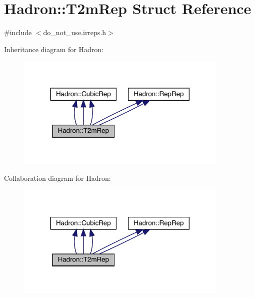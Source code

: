 \hypertarget{structHadron_1_1T2mRep}{}\section{Hadron\+:\+:T2m\+Rep Struct Reference}
\label{structHadron_1_1T2mRep}


{\ttfamily \#include $<$do\+\_\+not\+\_\+use.\+irreps.\+h$>$}



Inheritance diagram for Hadron\+:
\nopagebreak
\begin{figure}[H]
\begin{center}
\leavevmode
\includegraphics[width=288pt]{d0/dfb/structHadron_1_1T2mRep__inherit__graph}
\end{center}
\end{figure}


Collaboration diagram for Hadron\+:
\nopagebreak
\begin{figure}[H]
\begin{center}
\leavevmode
\includegraphics[width=288pt]{d8/d40/structHadron_1_1T2mRep__coll__graph}
\end{center}
\end{figure}
